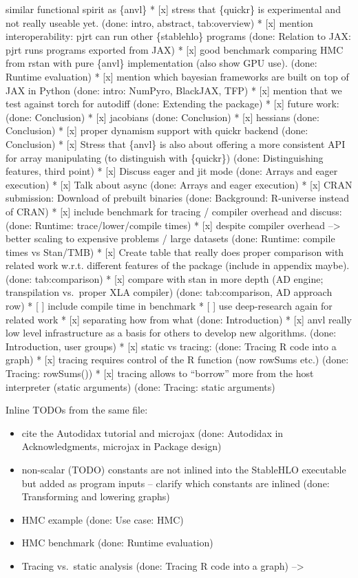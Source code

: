 similar functional spirit as \{anvl\}
* {[}x{]} stress that \{quickr\} is experimental and not really useable yet. (done: intro, abstract, tab:overview)
* {[}x{]} mention interoperability: pjrt can run other \{stablehlo\} programs (done: Relation to JAX: pjrt runs programs exported from JAX)
* {[}x{]} good benchmark comparing HMC from rstan with pure \{anvl\} implementation (also show GPU use). (done: Runtime evaluation)
* {[}x{]} mention which bayesian frameworks are built on top of JAX in Python (done: intro: NumPyro, BlackJAX, TFP)
* {[}x{]} mention that we test against torch for autodiff (done: Extending the package)
* {[}x{]} future work: (done: Conclusion)
* {[}x{]} jacobians (done: Conclusion)
* {[}x{]} hessians (done: Conclusion)
* {[}x{]} proper dynamism support with quickr backend (done: Conclusion)
* {[}x{]} Stress that \{anvl\} is also about offering a more consistent API for array manipulating (to distinguish with \{quickr\}) (done: Distinguishing features, third point)
* {[}x{]} Discuss eager and jit mode (done: Arrays and eager execution)
* {[}x{]} Talk about async (done: Arrays and eager execution)
* {[}x{]} CRAN submission: Download of prebuilt binaries (done: Background: R-universe instead of CRAN)
* {[}x{]} include benchmark for tracing / compiler overhead and discuss: (done: Runtime: trace/lower/compile times)
* {[}x{]} despite compiler overhead --\textgreater{} better scaling to expensive problems / large datasets (done: Runtime: compile times vs Stan/TMB)
* {[}x{]} Create table that really does proper comparison with related work w.r.t. different features of the package (include in appendix maybe). (done: tab:comparison)
* {[}x{]} compare with stan in more depth (AD engine; transpilation vs.~proper XLA compiler) (done: tab:comparison, AD approach row)
* {[} {]} include compile time in benchmark
* {[} {]} use deep-research again for related work
* {[}x{]} separating how from what (done: Introduction)
* {[}x{]} anvl really low level infrastructure as a basis for others to develop new algorithms. (done: Introduction, user groups)
* {[}x{]} static vs tracing: (done: Tracing R code into a graph)
* {[}x{]} tracing requires control of the R function (now rowSums etc.) (done: Tracing: rowSums())
* {[}x{]} tracing allows to ``borrow'' more from the host interpreter (static arguments) (done: Tracing: static arguments)

Inline TODOs from the same file:

\begin{itemize}
\tightlist
\item[$\boxtimes$]
  cite the Autodidax tutorial and microjax (done: Autodidax in Acknowledgments, microjax in Package design)
\item[$\boxtimes$]
  non-scalar (TODO) constants are not inlined into the StableHLO executable but added as program inputs -- clarify which constants are inlined (done: Transforming and lowering graphs)
\item[$\boxtimes$]
  HMC example (done: Use case: HMC)
\item[$\boxtimes$]
  HMC benchmark (done: Runtime evaluation)
\item[$\boxtimes$]
  Tracing vs.~static analysis (done: Tracing R code into a graph)
  --\textgreater{}
\end{itemize}

